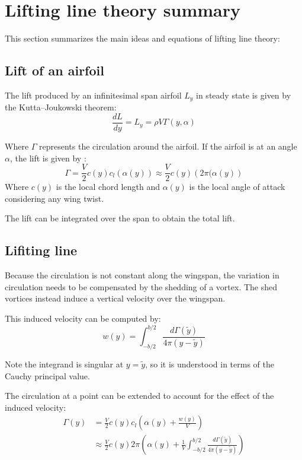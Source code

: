 \section{Lifting line theory summary}
This section summarizes the main ideas and equations of lifting line theory:

\subsection{Lift of an airfoil}
The lift produced by an infinitesimal span airfoil $L_y$ in steady state is given by the Kutta–Joukowski theorem: 
\begin{equation}
    \frac{dL}{dy} = L_y = \rho V \Gamma(y, \alpha)
\end{equation}

Where $\Gamma$ represents the circulation around the airfoil. If the airfoil is at an angle $\alpha$, the lift is given by \cite[eqn 21]{leishman}:
\begin{equation}
    \Gamma = \frac{V}{2} c(y) c_l(\alpha(y)) \approx \frac{V}{2} c(y) \left(2 \pi (\alpha(y)\right)
\end{equation}
Where $c(y)$ is the local chord length and $\alpha(y)$ is the local angle of attack considering any wing twist.

The lift can be integrated over the span to obtain the total lift.

\subsection{Lifiting line}
Because the circulation is not constant along the wingspan, the variation in circulation needs to be compensated by the shedding of a vortex. The shed vortices instead induce a vertical velocity over the wingspan.

This induced velocity can be computed by:
\begin{equation}
    w(y) = \int_{-b/2}^{b/2} \frac{d\Gamma(\tilde{y})}{4\pi\left(y - \tilde{y}\right)}
\end{equation}

Note the integrand is singular at $y = \tilde{y}$, so it is understood in terms of the Cauchy principal value.

The circulation at a point can be extended to account for the effect of the induced velocity:
\begin{align}
    \Gamma(y)   &= \frac{V}{2} c(y)  c_l\left( \alpha(y) + \frac{w(y)}{V}\right) \\
                &\approx \frac{V}{2} c(y) 2 \pi\left(\alpha(y) + \frac{1}{V} \int_{-b/2}^{b/2} \frac{d\Gamma(\tilde{y})}{4\pi\left(y - \tilde{y}\right)} \right)
\end{align}

